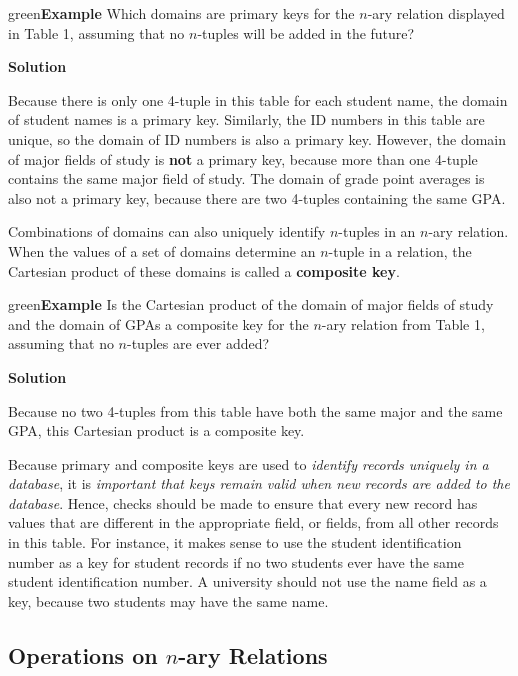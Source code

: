 \documentclass[11pt]{article}
\newenvironment{example}[1][\unskip]{\begin{mybox}{green}{\textbf{Example} {#1}}}{\end{mybox}}
\begin{document}
\begin{example}
Which domains are primary keys for the $n$-ary relation displayed in Table 1, assuming that no $n$-tuples will be added in the future?

\textbf{Solution}

Because there is only one 4-tuple in this table for each student name, the domain of student names is a primary key. Similarly, the ID numbers in this table are unique, so the domain of ID numbers is also a primary key. 
However, the domain of major fields of study is \textbf{not} a primary key, because more than one 4-tuple contains the same major field of study. The domain of grade point averages is also not a primary key, because there are two 4-tuples containing the same GPA.
\end{example}

Combinations of domains can also uniquely identify $n$-tuples in an $n$-ary relation. When the values of a set of domains determine an $n$-tuple in a relation, the Cartesian product of these domains is called a \textbf{composite key}.

\begin{example}
Is the Cartesian product of the domain of major fields of study and the domain of GPAs a composite key for the $n$-ary relation from Table 1, assuming that no $n$-tuples are ever added?

\textbf{Solution}

Because no two 4-tuples from this table have both the same major and the same GPA, this Cartesian product is a composite key.
\end{example}

Because primary and composite keys are used to \textit{identify records uniquely in a database}, it is \textit{important that keys remain valid when new records are added to the database}. Hence, checks should be made to ensure that every new record has values that are different in the appropriate field, or fields, from all other records in this table. 
For instance, it makes sense to use the student identification number as a key for student records if no two students ever have the same student identification number. A university should not use the name field as a key, because two students may have the same name.

\subsection{Operations on $n$-ary Relations}
\end{document}

